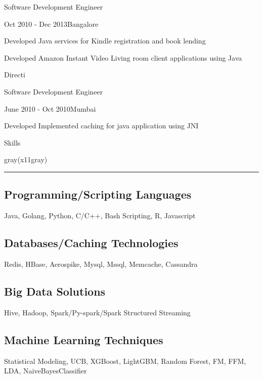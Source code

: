 \documentclass[8pt,a4paper]{article}
\begin{document}
\begin{multicols}{2}
\begin{expsubsec}{Software Development Engineer}
\end{expsubsec}
\begin{timeandlocation}Oct 2010 - Dec 2013{\textbar}Bangalore
\end{timeandlocation}
\begin{desc}{Developed Java services for Kindle registration and book lending}
\end{desc}
\begin{desc}{Developed Amazon Instant Video Living room client applications using Java}
\end{desc}
\begin{expsec}{Directi}
\end{expsec}
\begin{expsubsec}{Software Development Engineer}
\end{expsubsec}
\begin{timeandlocation}June 2010 - Oct 2010{\textbar}Mumbai
\end{timeandlocation}
\begin{desc}{Developed Implemented caching for java application using JNI}
\end{desc}
\vspace{4mm}
\begin{section}{Skills}
\end{section}
\begin{color}{gray(x11gray)}\hrule\end{color}
\vspace{5mm}
\subsection{Programming/Scripting Languages}
Java, Golang, Python, C/C++, Bash Scripting, R, Javascript
\subsection{Databases/Caching Technologies}
Redis, HBase, Aerospike, Mysql, Mssql, Memcache, Cassandra
\subsection{Big Data Solutions}
Hive, Hadoop, Spark/Py-spark/Spark Structured Streaming
\subsection{Machine Learning Techniques}
Statistical Modeling, UCB, XGBoost, LightGBM, Random Forest, FM, FFM, LDA, NaiveBayesClassifier

\end{multicols}
\end{document}
